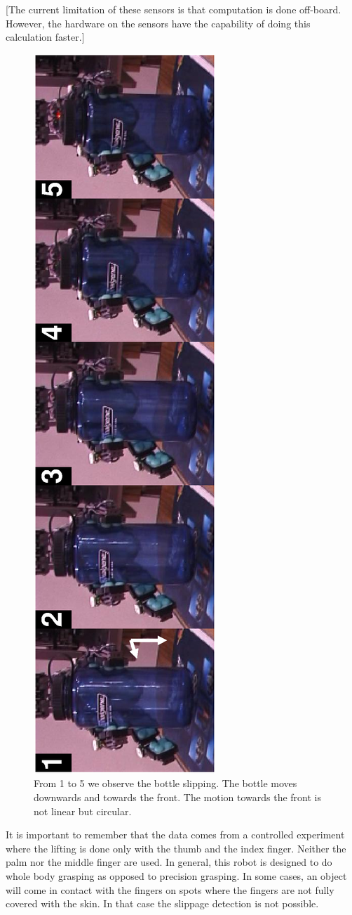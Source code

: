[The current limitation of these sensors is that computation is
done off-board. However, the hardware on the sensors have the
capability of doing this calculation faster.]


\begin{figure}[htbp]
\centerline{
\includegraphics[height=\columnwidth, angle=270 ]{./figures/Slippage.eps}
} \caption[Bottle slipping]{From 1 to 5 we observe the bottle
slipping. The bottle moves downwards and towards the front. The
motion towards the front is not linear but circular.}
\label{fig:slipseq}
\end{figure}


It is important to remember that the data comes from a controlled
experiment where the lifting is done only with the thumb and the
index finger. Neither the palm nor the middle finger are used. In
general, this robot is designed to do whole body grasping as
opposed to precision grasping. In some cases, an object will come
in contact with the fingers on spots where the fingers are not
fully covered with the skin. In that case the slippage detection
is not possible.

